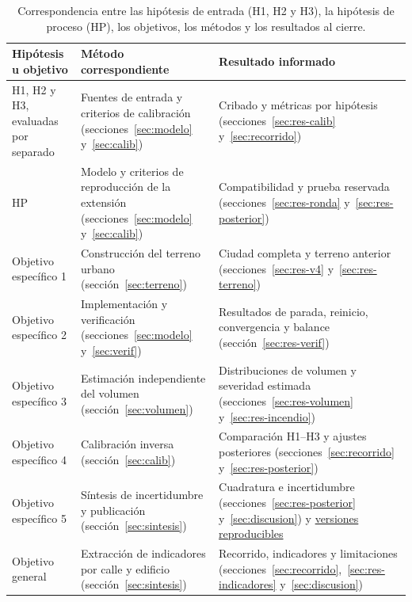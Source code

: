 \begin{table}[htbp]\centering\small
\caption{Correspondencia entre las hipótesis de entrada (H1, H2 y H3), la hipótesis de proceso (HP), los objetivos, los métodos y los resultados al cierre.}\label{tab:correspondencia}
\begin{tabular}{@{}>{\raggedright\arraybackslash}p{}>{\raggedright\arraybackslash}p{}>{\raggedright\arraybackslash}p{}@{}}\toprule
Hipótesis u objetivo & Método correspondiente & Resultado informado\\\midrule
H1, H2 y H3, evaluadas por separado & Fuentes de entrada y criterios de calibración (secciones~\ref{sec:modelo} y~\ref{sec:calib}) & Cribado y métricas por hipótesis (secciones~\ref{sec:res-calib} y~\ref{sec:recorrido})\\
HP & Modelo y criterios de reproducción de la extensión (secciones~\ref{sec:modelo} y~\ref{sec:calib}) & Compatibilidad y prueba reservada (secciones~\ref{sec:res-ronda} y~\ref{sec:res-posterior})\\
Objetivo específico 1 & Construcción del terreno urbano (sección~\ref{sec:terreno}) & Ciudad completa y terreno anterior (secciones~\ref{sec:res-v4} y~\ref{sec:res-terreno})\\
Objetivo específico 2 & Implementación y verificación (secciones~\ref{sec:modelo} y~\ref{sec:verif}) & Resultados de parada, reinicio, convergencia y balance (sección~\ref{sec:res-verif})\\
Objetivo específico 3 & Estimación independiente del volumen (sección~\ref{sec:volumen}) & Distribuciones de volumen y severidad estimada (secciones~\ref{sec:res-volumen} y~\ref{sec:res-incendio})\\
Objetivo específico 4 & Calibración inversa (sección~\ref{sec:calib}) & Comparación H1--H3 y ajustes posteriores (secciones~\ref{sec:recorrido} y~\ref{sec:res-posterior})\\
Objetivo específico 5 & Síntesis de incertidumbre y publicación (sección~\ref{sec:sintesis}) & Cuadratura e incertidumbre (secciones~\ref{sec:res-posterior} y~\ref{sec:discusion}) y \hyperref[sec:versiones]{versiones reproducibles}\\
Objetivo general & Extracción de indicadores por calle y edificio (sección~\ref{sec:sintesis}) & Recorrido, indicadores y limitaciones (secciones~\ref{sec:recorrido},~\ref{sec:res-indicadores} y~\ref{sec:discusion})\\\bottomrule
\end{tabular}
\end{table}
